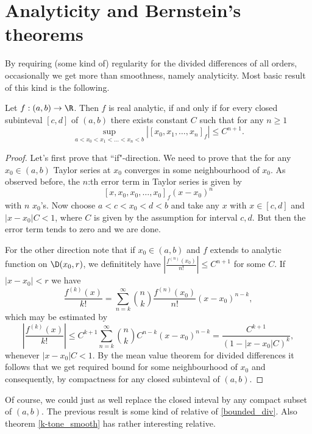 \section{Analyticity and Bernstein's theorems}

By requiring (some kind of) regularity for the divided differences of all orders, occasionally we get more than smoothness, namely analyticity. Most basic result of this kind is the following.

\begin{lause}\label{div_anal}
	Let $f : (a, b) \to \R$. Then $f$ is real analytic, if and only if for every closed subinteval $[c, d]$ of $(a, b)$ there exists constant $C$ such that for any $n \geq 1$
	\[
		\sup_{a < x_{0} < x_{1} < \ldots < x_{n}< b} |[x_{0}, x_{1}, \ldots, x_{n}]_{f}| \leq C^{n + 1}.
	\]
\end{lause}
\begin{proof}
	Let's first prove that ``if"-direction. We need to prove that the for any $x_{0} \in (a, b)$ Taylor series at $x_{0}$ converges in some neighbourhood of $x_{0}$. As observed before, the $n$:th error term in Taylor series is given by
	\[
		[x, x_{0}, x_{0}, \ldots, x_{0}]_{f} (x - x_{0})^{n}
	\]
	with $n$ $x_{0}$'s. Now choose $a < c < x_{0} < d < b$ and take any $x$ with $x \in [c, d]$ and $|x - x_{0}| C < 1$, where $C$ is given by the assumption for interval $c, d$. But then the error term tends to zero and we are done.

	For the other direction note that if $x_{0} \in (a, b)$ and $f$ extends to analytic function on $\D(x_{0}, r)$, we definititely have $\left|\frac{f^{(n)}(x_{0})}{n!}\right| \leq C^{n + 1}$ for some $C$. If $|x - x_{0}| < r$ we have
	\[
		\frac{f^{(k)}(x)}{k!} = \sum_{n = k}^{\infty} \binom{n}{k} \frac{f^{(n)}(x_{0})}{n!} (x - x_{0})^{n - k},
	\]
	which may be estimated by
	\[
	 \left|\frac{f^{(k)}(x)}{k!}\right| \leq C^{k + 1}\sum_{n = k}^{\infty} \binom{n}{k} C^{n - k} (x - x_{0})^{n - k} = \frac{C^{k + 1} }{(1 - |x - x_{0}| C)^{k}},
	\]
	whenever $|x - x_{0}| C < 1$. By the mean value theorem for divided differences it follows that we get required bound for some neighbourhood of $x_{0}$ and consequently, by compactness for any closed subinteval of $(a, b)$.
\end{proof}

Of course, we could just as well replace the closed inteval by any compact subset of $(a, b)$. The previous result is some kind of relative of \ref{bounded_div}. Also theorem \ref{k-tone_smooth} has rather interesting relative.

